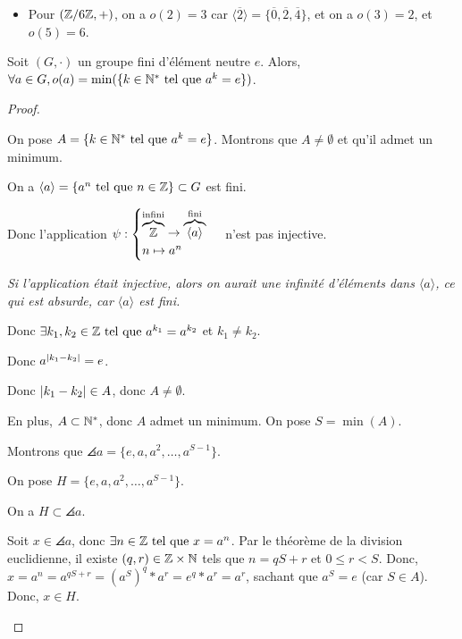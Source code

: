 \documentclass[12pt, a4paper]{report}
\begin{document}
\begin{example}
    \begin{itemize}
        \item Pour $(\mathbb{Z}/6\mathbb{Z},+)$, on a $o(2)=3$ car $\langle \overline{2} \rangle = \{\overline{0}, \overline{2}, \overline{4}\}$, et on a $o(3)=2$, et $o(5)=6$.
    \end{itemize}
\end{example}


\begin{property}
    Soit $(G,\cdot)$ un groupe fini d'élément neutre $e$. Alors, $\forall a \in G, o(a) = \min(\{k\in\mathbb{N}^* \text{ tel que } a^k = e\})$.
\end{property}

\begin{proof}
    \begin{outline}
        \1 On pose $A=\{k\in\mathbb{N}^* \text{ tel que } a^k = e\}$. Montrons que $A\ne\emptyset$ et qu'il admet un minimum.

        \2 On a $\left\langle a\right\rangle = \{a^n \text{ tel que } n \in \mathbb{Z}\} \subset G$ est fini.

        \2 Donc l'application $\psi : \begin{cases}\overbrace{\mathbb{Z}}^{\text{infini}} \to \overbrace{\left\langle a\right\rangle}^{\text{fini}}\\ n \mapsto a^n\end{cases}$ n'est pas injective.

        \3 \textit{Si l'application était injective, alors on aurait une infinité d'éléments dans $\langle a \rangle$, ce qui est absurde, car $\langle a \rangle$ est fini.}

        \2 Donc $\exists k_1,k_2 \in \mathbb{Z} \text{ tel que } a^{k_1} = a^{k_2}$ et $k_1 \ne k_2$.

        \2 Donc $a^{\left|k_1 - k_2\right|} = e$.

        \2 Donc $\left|k_1 - k_2\right| \in A$, donc $A \ne \emptyset$.

        \2 En plus, $A \subset \mathbb{N}^*$, donc $A$ admet un minimum. On pose $S=\min(A)$.

        \1 Montrons que $\angles{a} = \{e, a, a^2, \ldots, a^{S-1}\}$.

        \2 On pose $H = \{e, a, a^2, \ldots, a^{S-1}\}$.

        \2 On a $H \subset \angles{a}$.

        \2 Soit $x\in\angles{a}$, donc $\exists n \in \mathbb{Z} \text{ tel que } x = a ^n$.
        \2 Par le théorème de la division euclidienne, il existe $(q,r) \in \mathbb{Z} \times \mathbb{N}$ tels que $n = qS + r$ et $0 \le r < S$.
        \2 Donc, $x = a^n = a^{qS + r} = (a^S)^q * a^r = e^q * a^r = a^r$, sachant que $a^S = e$ (car $S \in A$).
        \2 Donc, $x \in H$.
    \end{outline}
\end{proof}
\end{document}
